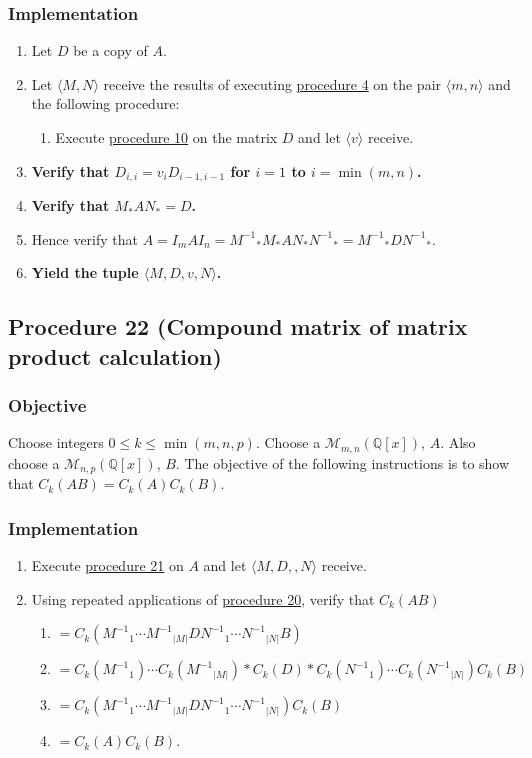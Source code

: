 \documentclass[twocolumn]{article}
\begin{document}
			\subsubsection{Implementation}
				\begin{enumerate}
					\item Let $D$ be a copy of $A$.
					\item Let $\langle M,N\rangle$ receive the results of executing \hyperref[sec:procedure 4]{procedure 4} on the pair $\langle m,n\rangle$ and the following procedure:
						\begin{enumerate}
							\item Execute \hyperref[sec:procedure 10]{procedure 10} on the matrix $D$ and let $\langle v\rangle$ receive.
						\end{enumerate}
					\item \textbf{Verify that $D_{i,i}=v_iD_{i-1,i-1}$ for $i=1$ to $i=\min(m,n)$.}
					\item \textbf{Verify that $M_*AN_*=D$.}
					\item Hence verify that $A=I_mAI_n={M^{-1}}_*M_*AN_*{N^{-1}}_*={M^{-1}}_*D{N^{-1}}_*$.
					\item \textbf{Yield the tuple $\langle M,D,v,N\rangle$.}
				\end{enumerate}
		\subsection{Procedure 22 (Compound matrix of matrix product calculation)}\label{sec:procedure 22}
			\subsubsection{Objective}
				Choose integers $0\le k\le\min(m,n,p)$. Choose a $\mathcal{M}_{m,n}(\mathbb{Q}[x])$, $A$. Also choose a $\mathcal{M}_{n,p}(\mathbb{Q}[x])$, $B$. The objective of the following instructions is to show that $C_k(AB)=C_k(A)C_k(B)$.
			\subsubsection{Implementation}
				\begin{enumerate}
					\item Execute \hyperref[sec:procedure 21]{procedure 21} on $A$ and let $\langle M,D,,N\rangle$ receive.
					\item Using repeated applications of \hyperref[sec:procedure 20]{procedure 20}, verify that $C_k(AB)$
					\begin{enumerate}
						\item $=C_k({M^{-1}}_1\cdots {M^{-1}}_{\lvert M\rvert}D{N^{-1}}_1\cdots {N^{-1}}_{\lvert N\rvert}B)$
						\item $=C_k({M^{-1}}_1)\cdots C_k({M^{-1}}_{\lvert M\rvert})*C_k(D)*C_k({N^{-1}}_1)\cdots C_k({N^{-1}}_{\lvert N\rvert})C_k(B)$
						\item $=C_k({M^{-1}}_1\cdots {M^{-1}}_{\lvert M\rvert}D{N^{-1}}_1\cdots {N^{-1}}_{\lvert N\rvert})C_k(B)$
						\item $=C_k(A)C_k(B)$.
					\end{enumerate}
				\end{enumerate}
\end{document}
